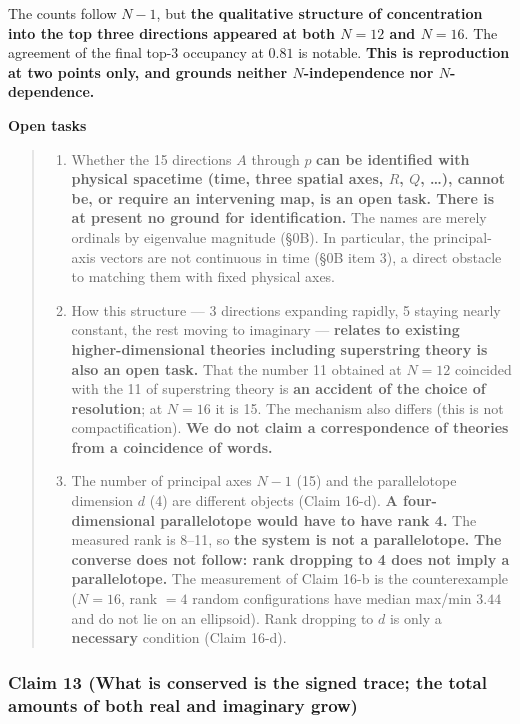 \documentclass[
  10pt,
]{article}
\providecommand{\tightlist}{%
  \setlength{\itemsep}{0pt}\setlength{\parskip}{0pt}}
\begin{document}
The counts follow \(N-1\), but \textbf{the qualitative structure of
concentration into the top three directions appeared at both \(N=12\)
and \(N=16\)}. The agreement of the final top-3 occupancy at \(0.81\) is
notable. \textbf{This is reproduction at two points only, and grounds
neither \(N\)-independence nor \(N\)-dependence.}

\textbf{Open tasks}

\begin{quote}
\begin{enumerate}
\def\labelenumi{\arabic{enumi}.}
\tightlist
\item
  Whether the 15 directions \(A\) through \(p\) \textbf{can be
  identified with physical spacetime (time, three spatial axes, \(R\),
  \(Q\), \ldots), cannot be, or require an intervening map, is an open
  task. There is at present no ground for identification.} The names are
  merely ordinals by eigenvalue magnitude (§0B). In particular, the
  principal-axis vectors are not continuous in time (§0B item 3), a
  direct obstacle to matching them with fixed physical axes.
\item
  How this structure --- 3 directions expanding rapidly, 5 staying
  nearly constant, the rest moving to imaginary --- \textbf{relates to
  existing higher-dimensional theories including superstring theory is
  also an open task.} That the number 11 obtained at \(N=12\) coincided
  with the 11 of superstring theory is \textbf{an accident of the choice
  of resolution}; at \(N=16\) it is 15. The mechanism also differs (this
  is not compactification). \textbf{We do not claim a correspondence of
  theories from a coincidence of words.}
\item
  The number of principal axes \(N-1\) (15) and the parallelotope
  dimension \(d\) (4) are different objects (Claim 16-d). \textbf{A
  four-dimensional parallelotope would have to have rank 4.} The
  measured rank is 8--11, so \textbf{the system is not a parallelotope.}
  \textbf{The converse does not follow: rank dropping to 4 does not
  imply a parallelotope.} The measurement of Claim 16-b is the
  counterexample (\(N=16\), rank \(=4\) random configurations have
  median max/min \(3.44\) and do not lie on an ellipsoid). Rank dropping
  to \(d\) is only a \textbf{necessary} condition (Claim 16-d).
\end{enumerate}
\end{quote}

\subsubsection{Claim 13 (What is conserved is the signed trace; the
total amounts of both real and imaginary
grow)}\label{claim-13-what-is-conserved-is-the-signed-trace-the-total-amounts-of-both-real-and-imaginary-grow}
\end{document}
